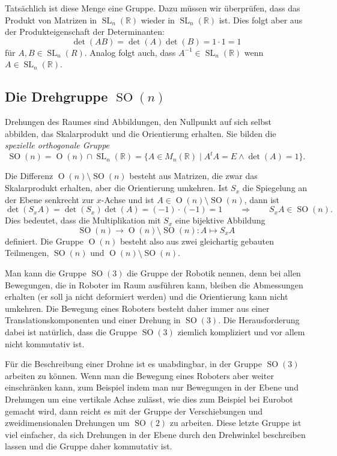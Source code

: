 Tatsächlich ist diese Menge eine Gruppe.
Dazu müssen wir überprüfen, dass das Produkt von Matrizen in
$\operatorname{SL}_n(\mathbb R)$
wieder in
$\operatorname{SL}_n(\mathbb R)$
ist.
Dies folgt aber aus der Produkteigenschaft der Determinanten:
\[
\det(AB) 
=
\det(A) \det(B)
=
1\cdot 1
=
1
\]
für $A,B\in\operatorname{SL}_n(R)$.
Analog folgt auch, dass $A^{-1}\in\operatorname{SL}_n(\mathbb R)$ wenn
$A\in\operatorname{SL}_n(\mathbb R)$.

%
%
\subsection{Die Drehgruppe $\operatorname{SO}(n)$}
Drehungen des Raumes sind Abbildungen, den Nullpunkt auf sich selbst
abbilden, das Skalarprodukt und die Orientierung erhalten.
Sie bilden die {\em spezielle orthogonale Gruppe}
\[
\operatorname{SO}(n) 
=
\operatorname{O}(n) \cap \operatorname{SL}_n(\mathbb R)
=
\{
A\in M_n(\mathbb R)\;|\; A^tA=E\wedge \det(A) = 1
\}.
\]

Die Differenz $\operatorname{O}(n) \setminus \operatorname{SO}(n)$
besteht aus Matrizen, die zwar das Skalarprodukt erhalten, aber die
Orientierung umkehren.
Ist $S_x$ die Spiegelung an der Ebene senkrecht zur $x$-Achse und ist
$A\in \operatorname{O}(n) \setminus \operatorname{SO}(n)$, dann ist
\[
\det(S_xA)= \det(S_x)\det(A) = (-1)\cdot(-1)=1
\qquad\Rightarrow\qquad
S_xA\in\operatorname{SO}(n).
\]
Dies bedeutet, dass die Multiplikation mit $S_x$ eine bijektive Abbildung
\[
\operatorname{SO}(n) \to \operatorname{O}(n)\setminus\operatorname{SO}(n)
:
A\mapsto S_xA
\]
definiert.
Die Gruppe $\operatorname{O}(n)$ besteht also aus zwei gleichartig gebauten
Teilmengen, $\operatorname{SO}(n)$  und
$\operatorname{O}(n)\setminus\operatorname{SO}(n)$.

Man kann die Gruppe $\operatorname{SO}(3)$ die Gruppe der Robotik nennen,
denn bei allen Bewegungen, die in Roboter im Raum ausführen kann,
bleiben die Abmessungen erhalten (er soll ja nicht deformiert werden)
und die Orientierung kann nicht umkehren.
Die Bewegung eines Roboters besteht daher immer aus einer
Translationskomponenten und einer Drehung in $\operatorname{SO}(3)$.
Die Herausforderung dabei ist natürlich, dass die Gruppe
$\operatorname{SO}(3)$ ziemlich kompliziert und vor allem nicht
kommutativ ist.

Für die Beschreibung einer Drohne ist es unabdingbar, in der
Gruppe $\operatorname{SO}(3)$ arbeiten zu können.
Wenn man die Bewegung eines Roboters aber weiter einschränken kann,
zum Beispiel indem man nur Bewegungen in der Ebene und Drehungen
um eine vertikale Achse zulässt, wie dies zum Beispiel bei
Eurobot gemacht wird, dann reicht es mit der Gruppe der Verschiebungen
und zweidimensionalen Drehungen um $\operatorname{SO}(2)$ zu arbeiten.
Diese letzte Gruppe ist viel einfacher, da sich Drehungen in der Ebene
durch den Drehwinkel beschreiben lassen und die Gruppe daher kommutativ ist.

